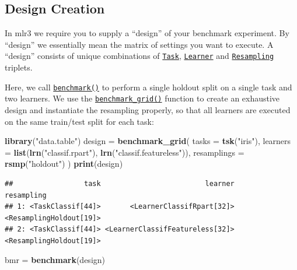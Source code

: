 \documentclass[]{scrbook}
\newenvironment{Shaded}{\begin{snugshade}}{\end{snugshade}}
\newcommand{\DataTypeTok}[1]{\textcolor[rgb]{0.13,0.29,0.53}{#1}}
\newcommand{\KeywordTok}[1]{\textcolor[rgb]{0.13,0.29,0.53}{\textbf{#1}}}
\newcommand{\NormalTok}[1]{#1}
\newcommand{\StringTok}[1]{\textcolor[rgb]{0.31,0.60,0.02}{#1}}
\renewenvironment{Shaded} {\begin{snugshade}\small} {\end{snugshade}}
\begin{document}
\hypertarget{bm-design}{%
\subsection{Design Creation}\label{bm-design}}

In mlr3 we require you to supply a ``design'' of your benchmark experiment.
By ``design'' we essentially mean the matrix of settings you want to execute.
A ``design'' consists of unique combinations of \href{https://mlr3.mlr-org.com/reference/Task.html}{\texttt{Task}}, \href{https://mlr3.mlr-org.com/reference/Learner.html}{\texttt{Learner}} and \href{https://mlr3.mlr-org.com/reference/Resampling.html}{\texttt{Resampling}} triplets.

Here, we call \href{https://mlr3.mlr-org.com/reference/benchmark.html}{\texttt{benchmark()}} to perform a single holdout split on a single task and two learners.
We use the \href{https://mlr3.mlr-org.com/reference/benchmark_grid.html}{\texttt{benchmark\_grid()}} function to create an exhaustive design and instantiate the resampling properly, so that all learners are executed on the same train/test split for each task:

\begin{Shaded}
\begin{Highlighting}[]
\KeywordTok{library}\NormalTok{(}\StringTok{"data.table"}\NormalTok{)}
\NormalTok{design =}\StringTok{ }\KeywordTok{benchmark_grid}\NormalTok{(}
  \DataTypeTok{tasks =} \KeywordTok{tsk}\NormalTok{(}\StringTok{"iris"}\NormalTok{),}
  \DataTypeTok{learners =} \KeywordTok{list}\NormalTok{(}\KeywordTok{lrn}\NormalTok{(}\StringTok{"classif.rpart"}\NormalTok{), }\KeywordTok{lrn}\NormalTok{(}\StringTok{"classif.featureless"}\NormalTok{)),}
  \DataTypeTok{resamplings =} \KeywordTok{rsmp}\NormalTok{(}\StringTok{"holdout"}\NormalTok{)}
\NormalTok{)}
\KeywordTok{print}\NormalTok{(design)}
\end{Highlighting}
\end{Shaded}

\begin{verbatim}
##                 task                         learner              resampling
## 1: <TaskClassif[44]>       <LearnerClassifRpart[32]> <ResamplingHoldout[19]>
## 2: <TaskClassif[44]> <LearnerClassifFeatureless[32]> <ResamplingHoldout[19]>
\end{verbatim}

\begin{Shaded}
\begin{Highlighting}[]
\NormalTok{bmr =}\StringTok{ }\KeywordTok{benchmark}\NormalTok{(design)}
\end{Highlighting}
\end{Shaded}
\end{document}
